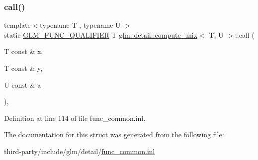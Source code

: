 \subsubsection{\texorpdfstring{call()}{call()}}
{\footnotesize\ttfamily template$<$typename T , typename U $>$ \\
static \hyperlink{setup_8hpp_a33fdea6f91c5f834105f7415e2a64407}{G\+L\+M\+\_\+\+F\+U\+N\+C\+\_\+\+Q\+U\+A\+L\+I\+F\+I\+ER} T \hyperlink{structglm_1_1detail_1_1compute__mix}{glm\+::detail\+::compute\+\_\+mix}$<$ T, U $>$\+::call (\begin{DoxyParamCaption}\item[{T const \&}]{x,  }\item[{T const \&}]{y,  }\item[{U const \&}]{a }\end{DoxyParamCaption})\hspace{0.3cm}{\ttfamily [inline]}, {\ttfamily [static]}}



Definition at line 114 of file func\+\_\+common.\+inl.



The documentation for this struct was generated from the following file\+:\begin{DoxyCompactItemize}
\item 
third-\/party/include/glm/detail/\hyperlink{func__common_8inl}{func\+\_\+common.\+inl}\end{DoxyCompactItemize}
